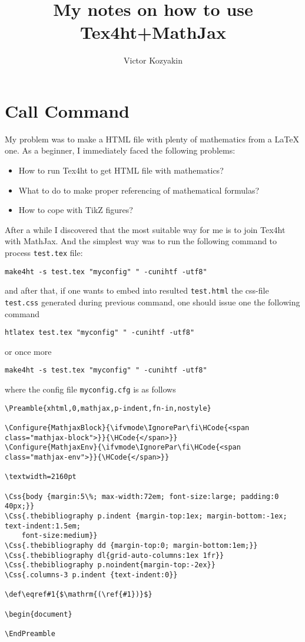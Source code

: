 \documentclass{article}
\title{My notes on how to use Tex4ht+MathJax}
\author{Victor Kozyakin}
\begin{document}
\maketitle

\section{Call Command}\label{S1}
My problem was to make a HTML file with plenty of mathematics from a \LaTeX{}
one. As a beginner, I immediately faced the following problems:
\begin{itemize}
  \item How to run Tex4ht to get HTML file with mathematics?
  \item What to do to make proper referencing of mathematical formulas?
  \item How to cope with TikZ figures?
\end{itemize}

After a while I discovered that the most suitable way for me is to join
Tex4ht with MathJax. And the simplest way was to run the following command to
process \verb|test.tex| file:

{\small
\begin{verbatim}
make4ht -s test.tex "myconfig" " -cunihtf -utf8"
\end{verbatim}}
  \noindent and after that, if one wants to embed into resulted
  \verb|test.html| the css-file \verb|test.css| generated during previous
  command, one should issue one the following command {\small
    \begin{verbatim}
htlatex test.tex "myconfig" " -cunihtf -utf8"
\end{verbatim}
    \noindent or once more
    \begin{verbatim}
make4ht -s test.tex "myconfig" " -cunihtf -utf8"
\end{verbatim}}
    \noindent where the config file \verb|myconfig.cfg| is as
    follows

    {\small
    \begin{verbatim}
\Preamble{xhtml,0,mathjax,p-indent,fn-in,nostyle}

\Configure{MathjaxBlock}{\ifvmode\IgnorePar\fi\HCode{<span class="mathjax-block">}}{\HCode{</span>}}
\Configure{MathjaxEnv}{\ifvmode\IgnorePar\fi\HCode{<span class="mathjax-env">}}{\HCode{</span>}}

\textwidth=2160pt

\Css{body {margin:5\%; max-width:72em; font-size:large; padding:0 40px;}}
\Css{.thebibliography p.indent {margin-top:1ex; margin-bottom:-1ex; text-indent:1.5em;
    font-size:medium}}
\Css{.thebibliography dd {margin-top:0; margin-bottom:1em;}}
\Css{.thebibliography dl{grid-auto-columns:1ex 1fr}}
\Css{.thebibliography p.noindent{margin-top:-2ex}}
\Css{.columns-3 p.indent {text-indent:0}}

\def\eqref#1{$\mathrm{(\ref{#1})}$}

\begin{document}

\EndPreamble
\end{verbatim}}
\end{document}
